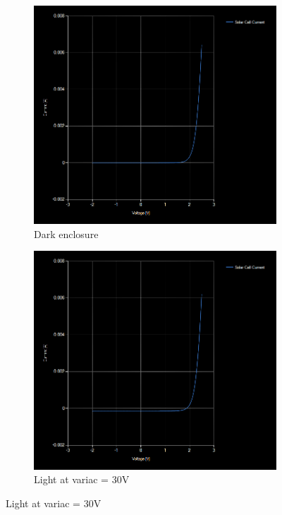 \begin{figure}[ht] 
  \begin{subfigure}[b]{0.5\linewidth}
    \centering
    \includegraphics[width=0.90\linewidth]{figures/DarkChar.png} 
    \caption{Dark enclosure} 
    \label{fig:dark} 
    \vspace{4ex}
  \end{subfigure}%
  \begin{subfigure}[b]{0.5\linewidth}
    \centering
    \includegraphics[width=0.90\linewidth]{figures/30VChar.png} 
    \caption{Light at variac = 30V } 
    \label{fig:30} 

\end{subfigure}
\end{figure}
